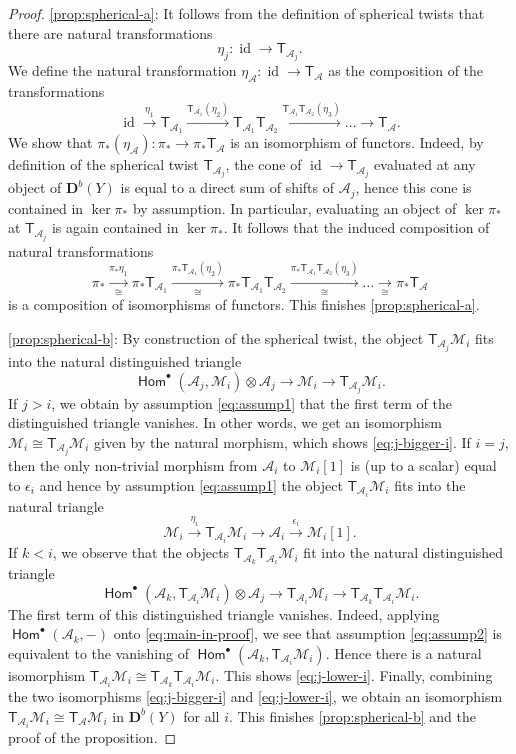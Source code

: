 \documentclass[a4paper,11pt, reqno]{amsart}
\def\DD{\mathbf D}
\def\sA{\mathscr{A}}
\def\sM{\mathscr{M}}
\def\id{{\operatorname{id}}}
\newcommand{\opname}[1]{\operatorname{\mathsf{#1}}}
\newcommand{\Hom}{\opname{Hom}}
\def\Db{\DD^b}
\newcommand{\bT}{\mathsf{T}}
\theoremstyle{plain}
\theoremstyle{definition}
\numberwithin{equation}{section}
\newlength{\arrow}
\begin{document}
\begin{proof}
    \ref{prop:spherical-a}: It follows from the definition of spherical twists that there are natural transformations 
    \[
    \eta_j \colon \id \to \bT_{ \sA_j} .
    \]
    We define the natural transformation $\eta_{\sA} \colon \id \to \bT_{\sA}$ as the composition of the transformations
\[
\id \xrightarrow{\eta_{1}} \bT_{ \sA_1} \xrightarrow{\bT_{ \sA_1}( \eta_2 )} \bT_{ \sA_1}  \bT_{ \sA_2} \xrightarrow{\bT_{ \sA_1} \bT_{ \sA_2} ( \eta_3 )} \ldots \to \bT_{\sA} .
\]
We show that $\pi_\ast (\eta_{\sA} ) : \pi_\ast \to \pi_\ast \bT_{\sA}$ is an isomorphism of functors.
    Indeed, by definition of the spherical twist $\bT_{ \sA_j}$, the cone of $\id \to \bT_{ \sA_j}$ evaluated at any object of $\Db(Y)$ is equal to a direct sum of shifts of $\sA_j$, hence this cone is contained in $\ker  \pi_\ast $ by assumption.
    In particular, evaluating an object of $\ker  \pi_\ast $ at $\bT_{\sA_j}$ is again contained in $\ker \pi_\ast $.
    It follows that the induced composition of natural transformations
    \[
\pi_\ast \xrightarrow[\cong]{\pi_\ast \eta_{1}} \pi_\ast \bT_{\sA_1} \xrightarrow[\cong]{\pi_\ast\bT_{ \sA_1}( \eta_2 )} \pi_\ast\bT_{ \sA_1}  \bT_{ \sA_2} \xrightarrow[\cong]{\pi_\ast \bT_{\sA_1} \bT_{\sA_2} ( \eta_3 )} \ldots \xrightarrow[\cong]{} \pi_\ast\bT_{\sA} 
\]
is a composition of isomorphisms of functors. This finishes \ref{prop:spherical-a}.
    
\ref{prop:spherical-b}: By construction of the spherical twist, the object $\bT_{{\sA_j}}\sM_i$ fits into the natural distinguished triangle
\[
\Hom^\bullet ( \sA_j , \sM_i ) \otimes \sA_j \to \sM_i \to \bT_{\sA_j} \sM_i .
\]
If $j>i$, we obtain by assumption \eqref{eq:assump1} that the first term of the distinguished triangle vanishes. 
In other words, we get an isomorphism $\sM_i \cong \bT_{\sA_j} \sM_i$ given by the natural morphism, which shows \eqref{eq:j-bigger-i}.
If $i=j$, then the only non-trivial morphism from $\sA_i  $ to $\sM_i [1]$ is (up to a scalar) equal to $\epsilon_i$ and hence by assumption \eqref{eq:assump1} the object $\bT_{{\sA_i}}\sM_i$ fits into the natural triangle
\begin{equation}\label{eq:main-in-proof}
    \sM_i \xrightarrow{\eta_i} \bT_{\sA_i} \sM_i \to \sA_i \xrightarrow{\epsilon_i }  \sM_i [1] .
\end{equation}
If $k<i$, we observe that the objects $\bT_{\sA_k} \bT_{\sA_i} \sM_i $ fit into the natural distinguished triangle 
\[
\Hom^\bullet ( \sA_k , \bT_{\sA_i} \sM_i ) \otimes \sA_j \to \bT_{\sA_i} \sM_i \to \bT_{\sA_k} \bT_{\sA_i} \sM_i .
\]
The first term of this distinguished triangle vanishes.
Indeed, applying $\Hom^\bullet (\sA_k , - )$ onto \eqref{eq:main-in-proof}, we see that assumption \eqref{eq:assump2} is equivalent to the vanishing of $\Hom^\bullet ( \sA_k , \bT_{\sA_i} \sM_i ) $.
Hence there is a natural isomorphism $\bT_{\sA_i} \sM_i \cong \bT_{\sA_k} \bT_{\sA_i} \sM_i$. This shows \eqref{eq:j-lower-i}.
Finally, combining the two isomorphisms \eqref{eq:j-bigger-i} and \eqref{eq:j-lower-i}, we obtain an isomorphism $\bT_{\sA_i } \sM_i \cong \bT_{\sA} \sM_i$ in $\Db(Y)$ for all $i$.
This finishes \ref{prop:spherical-b} and the proof of the proposition.
\end{proof}
\end{document}
